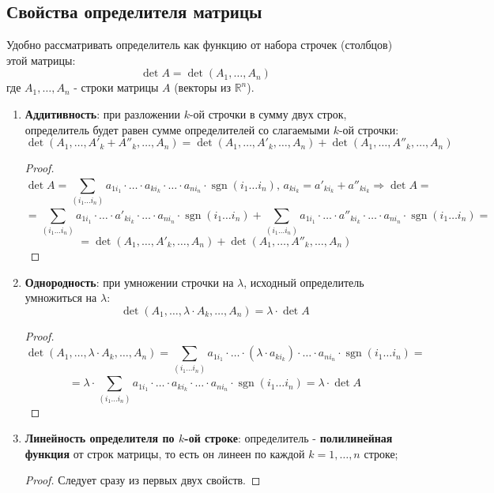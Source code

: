 \documentclass[12pt]{article}
\newcommand{\MR}{\mathbb{R}}
\theoremstyle{definition}
\DeclareMathOperator{\sgn}{sgn}
\newcommand{\ddsum}[2]{\displaystyle\sum\limits_{#1}^{#2}}
\begin{document}
\subsection*{Свойства определителя матрицы}
Удобно рассматривать определитель как функцию от набора строчек (столбцов) этой матрицы: 
$$\det{A} = \det{(A_1, \dotsc, A_n)}$$
где $A_1, \dotsc, A_n$ - строки матрицы $A$ (векторы из $\MR^n$).

\begin{enumerate}[label=\arabic*)]
	\item \textbf{Аддитивность}: при разложении $k$-ой строчки в сумму двух строк, определитель будет равен сумме определителей со слагаемыми $k$-ой строчки:
	$$
		\det{(A_1, \dotsc, A'_k + A''_k, \dotsc, A_n)} = \det{(A_1, \dotsc, A'_k , \dotsc, A_n)} + \det{(A_1, \dotsc,  A''_k, \dotsc, A_n)}
	$$ 
	\begin{proof}
		$$
			\det{A} = \ddsum{(i_1 \dotsc i_n)}{}a_{1{i_1}}{\cdot}\dotsc{\cdot}a_{k{i_k}}{\cdot}\dotsc{\cdot}a_{n{i_n}}{\cdot}\sgn{(i_1  \dotsc i_n )}, \, a_{k{i_k}} = a'_{k{i_k}} + a''_{k{i_k}} \Rightarrow \det{A} = 
		$$
		$$
			 = \ddsum{(i_1 \dotsc i_n)}{}a_{1{i_1}}{\cdot}\dotsc{\cdot}a'_{k{i_k}}{\cdot}\dotsc{\cdot}a_{n{i_n}}{\cdot}\sgn{(i_1  \dotsc i_n )} + \ddsum{(i_1 \dotsc i_n)}{}a_{1{i_1}}{\cdot}\dotsc{\cdot}a''_{k{i_k}}{\cdot}\dotsc{\cdot}a_{n{i_n}}{\cdot}\sgn{(i_1  \dotsc i_n )} = 
		$$
		$$
			=	\det{(A_1, \dotsc, A'_k , \dotsc, A_n)} + \det{(A_1, \dotsc,  A''_k, \dotsc, A_n)}
		$$
	\end{proof}
	\item \textbf{Однородность}: при умножении строчки на $\lambda$, исходный определитель умножиться на $\lambda$:
	$$
		\det{(A_1,\dotsc, \lambda{\cdot}A_k, \dotsc, A_n)} = \lambda {\cdot} \det{A}
	$$
	\begin{proof}
		$$
			\det{(A_1,\dotsc, \lambda{\cdot}A_k, \dotsc, A_n)} = \ddsum{(i_1 \dotsc i_n)}{}a_{1{i_1}}{\cdot}\dotsc{\cdot}(\lambda{\cdot}a_{k{i_k}}){\cdot}\dotsc{\cdot}a_{n{i_n}}{\cdot}\sgn{(i_1  \dotsc i_n )} =
		$$
		$$
			=	\lambda{\cdot}\ddsum{(i_1 \dotsc i_n)}{}a_{1{i_1}}{\cdot}\dotsc{\cdot}a_{k{i_k}}{\cdot}\dotsc{\cdot}a_{n{i_n}}{\cdot}\sgn{(i_1  \dotsc i_n )} = \lambda{\cdot}\det{A}
		$$
	\end{proof}
	\item \textbf{Линейность определителя по $k$-ой строке}: определитель - \textbf{полилинейная функция} от строк матрицы, то есть он линеен по каждой $k = 1,\dotsc,n$ строке;
	\begin{proof}
		Следует сразу из первых двух свойств.

\end{proof}
\end{enumerate}
\end{document}
